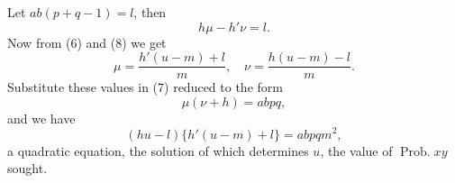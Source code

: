 \documentclass[oneside]{book}
\begin{document}
Let $ab (p + q - 1) = l$, then
\begin{equation*}\tag{8}
h \mu - h'\nu = l.
\end{equation*}
Now from (6) and (8) we get
\begin{equation*}
\mu = \frac{h' (u-m)+l}{m}, \quad \nu = \frac{h(u-m)-l}{m}.
\end{equation*}
Substitute these values in (7) reduced to the form
\begin{equation*}
\mu(\nu + h) = abpq,
\end{equation*}
and we have
\begin{equation*}\tag{9}
(hu - l) \{h'(u - m) + l\} = abpqm^2,
\end{equation*}
a quadratic equation, the solution of which determines $u$, the
value of $\operatorname{Prob. } xy$ sought.
\end{document}

